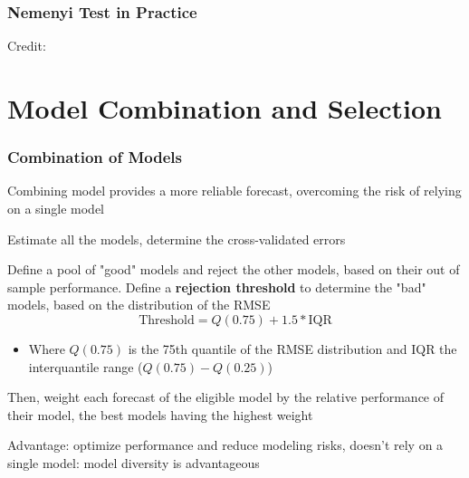 \documentclass{beamer}
\newenvironment{wideitemize}{\itemize\addtolength{\itemsep}{10pt}}{\enditemize}
\begin{document}
    \begin{frame}
      \frametitle{Nemenyi Test in Practice}
  \hspace*{15pt}\hbox{\scriptsize Credit:}      
    \end{frame}

    
    
\section{Model Combination and Selection}

\begin{frame}
  \frametitle{Combination of Models}

  \begin{wideitemize}
    \item Combining model provides a more reliable forecast, overcoming the risk of relying on a single model
    \item Estimate all the models, determine the cross-validated errors
    \item Define a pool of "good" models and reject the other models, based on their out of sample performance. Define a \textbf{rejection threshold} to determine the "bad" models, based on the distribution of the RMSE
      \begin{equation*}
        \text{Threshold} = Q(0.75) + 1.5*\text{IQR}
      \end{equation*}
      \begin{itemize}
      \item Where $Q(0.75)$ is the 75th quantile of the RMSE distribution and IQR the interquantile range ($Q(0.75) - Q(0.25)$)
      \end{itemize}
    \item Then, weight each forecast of the eligible model by the relative performance of their model, the best models having the highest weight
    \item Advantage: optimize performance and reduce modeling risks, doesn’t rely on a single model: model diversity is advantageous    
  \end{wideitemize}
  
\end{frame}
\end{document}
